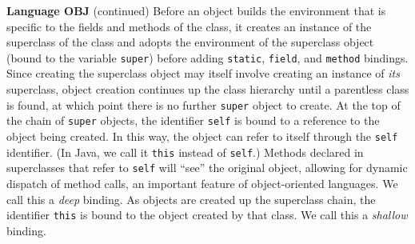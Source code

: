 \begin{minipage}[t]{\sw}
\slidenumber
\LARGE
{\bf Language OBJ} (continued)\exx
Before an object builds the environment that is specific
to the fields and methods of the class,
it creates an instance of the superclass of the class
and adopts the environment of the superclass object
(bound to the variable \verb'super')
before adding \verb'static', \verb'field', and \verb'method' bindings.
Since creating the superclass object may itself involve
creating an instance of {\em its} superclass,
object creation continues up the class hierarchy
until a parentless class is found,
at which point there is no further \verb'super' object to create.\exx
At the top of the chain of \verb'super' objects,
the identifier \verb'self' is bound
to a reference to the object being created.
In this way, the object can refer to itself
through the \verb'self' identifier.
(In Java, we call it \verb'this' instead of \verb'self'.)
Methods declared in superclasses
that refer to \verb'self' will ``see'' the original object,
allowing for dynamic dispatch of method calls,
an important feature of object-oriented languages.
We call this a {\em deep} binding.\exx
As objects are created up the superclass chain,
the identifier \verb'this' is bound
to the object created by that class.
We call this a {\em shallow} binding.
\end{minipage}
